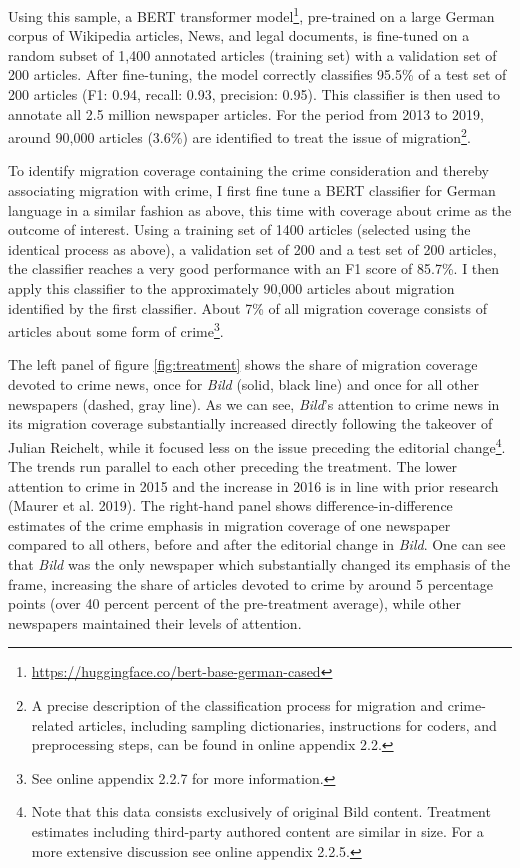 \documentclass[
  12pt,
]{article}
\begin{document}
Using this sample, a BERT transformer model\footnote{\url{https://huggingface.co/bert-base-german-cased}}, pre-trained on a large German corpus of Wikipedia articles, News, and legal documents, is fine-tuned on a random subset of 1,400 annotated articles (training set) with a validation set of 200 articles. After fine-tuning, the model correctly classifies 95.5\% of a test set of 200 articles (F1: 0.94, recall: 0.93, precision: 0.95). This classifier is then used to annotate all 2.5 million newspaper articles. For the period from 2013 to 2019, around 90,000 articles (3.6\%) are identified to treat the issue of migration\footnote{A precise description of the classification process for migration and crime-related articles, including sampling dictionaries, instructions for coders, and preprocessing steps, can be found in online appendix 2.2.}.

To identify migration coverage containing the crime consideration and thereby associating migration with crime, I first fine tune a BERT classifier for German language in a similar fashion as above, this time with coverage about crime as the outcome of interest. Using a training set of 1400 articles (selected using the identical process as above), a validation set of 200 and a test set of 200 articles, the classifier reaches a very good performance with an F1 score of 85.7\%. I then apply this classifier to the approximately 90,000 articles about migration identified by the first classifier. About 7\% of all migration coverage consists of articles about some form of crime\footnote{See online appendix 2.2.7 for more information.}.

The left panel of figure \ref{fig:treatment} shows the share of migration coverage devoted to crime news, once for \emph{Bild} (solid, black line) and once for all other newspapers (dashed, gray line). As we can see, \emph{Bild}'s attention to crime news in its migration coverage substantially increased directly following the takeover of Julian Reichelt, while it focused less on the issue preceding the editorial change\footnote{Note that this data consists exclusively of original Bild content. Treatment estimates including third-party authored content are similar in size. For a more extensive discussion see online appendix 2.2.5.}. The trends run parallel to each other preceding the treatment. The lower attention to crime in 2015 and the increase in 2016 is in line with prior research (Maurer et al. 2019). The right-hand panel shows difference-in-difference estimates of the crime emphasis in migration coverage of one newspaper compared to all others, before and after the editorial change in \emph{Bild}. One can see that \emph{Bild} was the only newspaper which substantially changed its emphasis of the frame, increasing the share of articles devoted to crime by around 5 percentage points (over 40 percent percent of the pre-treatment average), while other newspapers maintained their levels of attention.
\end{document}
